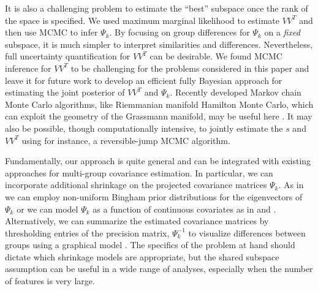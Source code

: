 \documentclass[12pt]{article}
\begin{document}
It is also a challenging problem to estimate the ``best'' subspace
once the rank of the space is specified.  We used maximum marginal
likelihood to estimate $VV^T$ and then use MCMC to
infer $\Psi_k$.  By focusing on group differences for $\Psi_k$ on a
\emph{fixed} subspace, it is much simpler to interpret similarities
and differences.  Nevertheless, full uncertainty quantification for
$VV^T$ can be desirable.  We found MCMC inference for $VV^T$ to be
challenging for the problems considered in this paper and leave it for
future work to develop an efficient fully Bayesian approach for
estimating the joint posterior of $VV^T$ and $\Psi_k$.  Recently
developed Markov chain Monte Carlo algorithms, like Riemmanian
manifold Hamilton Monte Carlo, which can exploit the geometry of the
Grassmann manifold, may be useful here \citep{Byrne2013,
  Girolami2011}.  It may also be possible, though computationally
intensive, to jointly estimate the $s$ and $VV^T$ using for instance,
a reversible-jump MCMC algorithm.


Fundamentally, our approach is quite general and can be integrated
with existing approaches for multi-group covariance
estimation.  In particular, we can incorporate additional shrinkage on
the projected covariance matrices $\Psi_k$.  As in \citet{Hoff2009} we
can employ non-uniform Bingham prior distributions for the
eigenvectors of $\Psi_k$ or we can model $\Psi_k$ as a function of continuous
covariates as in \citet{Yin2010} and \citet{Hoff2011}.  Alternatively, we can
summarize the estimated covariance matrices by thresholding entries of
the precision matrix, $\Psi_k^{-1}$ to visualize differences between
groups using a graphical model \citep{Meinshausen2006}.  The specifics
of the problem at hand should dictate which shrinkage models are
appropriate, but the shared subspace assumption can be useful in a
wide range of analyses, especially when the number of features is very
large.





\end{document}
